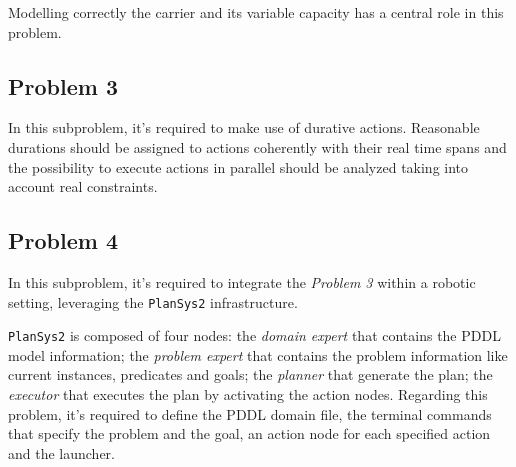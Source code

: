 Modelling correctly the carrier and its variable capacity has a central role in this problem.

\subsection{Problem 3}
In this subproblem, it's required to make use of durative actions.
Reasonable durations should be assigned to actions coherently with their real time spans and the possibility 
to execute actions in parallel should be analyzed taking into account real constraints.

\subsection{Problem 4}
In this subproblem, it's required to integrate the \textit{Problem 3} within a robotic setting, leveraging the 
\texttt{PlanSys2} infrastructure.

\texttt{PlanSys2} is composed of four nodes: the \textit{domain expert} that contains the PDDL model 
information; the \textit{problem expert} that contains the problem information like current instances,
predicates and goals; the \textit{planner} that generate the plan; the \textit{executor} that executes
the plan by activating the action nodes.
Regarding this problem, it's required to define the PDDL domain file, the terminal commands that specify
the problem and the goal, an action node for each specified action and the launcher.

